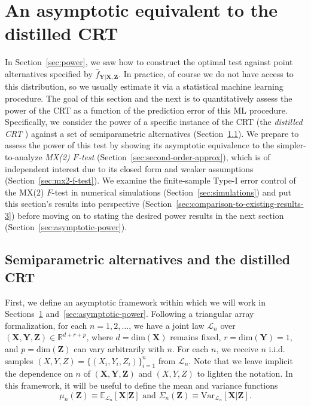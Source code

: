 \documentclass[12pt]{article}
\theoremstyle{definition}
\theoremstyle{remark}
\newcommand{\prx}{\bm X}
\newcommand{\srx}{X}
\newcommand{\prz}{\bm Z}
\newcommand{\srz}{Z}
\newcommand{\pry}{{\bm Y}}
\newcommand{\sry}{Y}
\begin{document}
\section{An asymptotic equivalent to the distilled CRT} \label{sec:weakening}

In Section~\ref{sec:power}, we saw how to construct the optimal test against point alternatives specified by $\bar f_{\pry|\prx,\prz}$. In practice, of course we do not have access to this distribution, so we usually estimate it via a statistical machine learning procedure. The goal of this section and the next is to quantitatively assess the power of the CRT as a function of the prediction error of this ML procedure. Specifically, we consider  the power of a specific instance of the CRT (the \textit{distilled CRT} \cite{Liu2020})  against a set of semiparametric alternatives (Section~\ref{sec:asymptotic-setup}). We prepare to assess the power of this test by showing its asymptotic equivalence to the simpler-to-analyze \textit{MX(2) $F$-test} (Section~\ref{sec:second-order-approx}), which is of independent interest due to its closed form and weaker assumptions (Section~\ref{sec:mx2-f-test}). We examine the finite-sample Type-I error control of the MX(2) $F$-test in numerical simulations (Section~\ref{sec:simulations}) and put this section's results into perspective (Section~\ref{sec:comparison-to-existing-results-3}) before moving on to stating the desired power results in the next section (Section~\ref{sec:asymptotic-power}).


\subsection{Semiparametric alternatives and the distilled CRT} \label{sec:asymptotic-setup}

First, we define an asymptotic framework within which we will work in Sections~\ref{sec:weakening} and~\ref{sec:asymptotic-power}. Following a triangular array formalization, for each $n = 1, 2, \dots$, we have a joint law $\mathcal L_n$ over $(\prx, \pry, \prz) \in \mathbb R^{d + r + p}$, where $d = \text{dim}(\prx)$ remains fixed, $r = \text{dim}(\pry) = 1$, and $p = \text{dim}(\prz)$ can vary arbitrarily with $n$. For each $n$, we receive $n$ i.i.d. samples $(\srx, \sry, \srz) = \{(\srx_i, \sry_i, \srz_i)\}_{i = 1}^n$ from $\mathcal L_n$. Note that we leave implicit the dependence on $n$ of $(\prx,\pry,\prz)$ and $(X,Y,Z)$ to lighten the notation. In this framework, it will be useful to define the mean and variance functions
\begin{equation}
	\mu_n(\prz) \equiv \mathbb E_{\mathcal L_n}[\prx|\prz]  \text{ and } \Sigma_n(\prz) \equiv \text{Var}_{\mathcal L_n}[\prx|\prz].
	\label{eq:conditional-mean-variance}
\end{equation}
\end{document}
